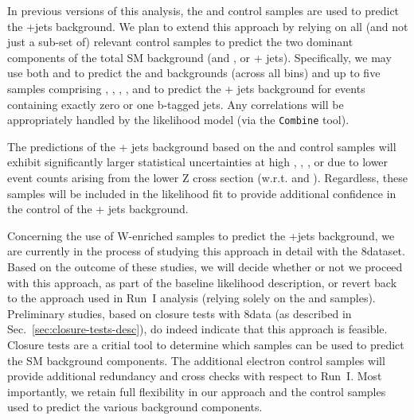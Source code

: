 {\bf

In previous versions of this analysis, the \mmj and \gj control
samples are used to predict the \znunu +jets background. We plan to
extend this approach by relying on all (and not just a sub-set of)
relevant control samples to predict the two dominant components of the
total SM background (\wj and \ttbar, or \znunu + jets). Specifically,
we may use both \mj and \ej to predict the \wj and \ttbar backgrounds
(across all \nb bins) and up to five samples comprising \zmmj, \zeej,
\gj, \wmj, and \wej to predict the \znunu + jets background for events
containing exactly zero or one b-tagged jets. Any correlations will be
appropriately handled by the likelihood model (via the
\texttt{Combine} tool).

The predictions of the \znunu + jets background based on the \zmmj and
\zeej control samples will exhibit significantly larger statistical
uncertainties at high \njet, \nb, \scalht, or \mht due to lower event
counts arising from the lower Z cross section (w.r.t. \gj and
\wj). Regardless, these samples will be included in the likelihood fit
to provide additional confidence in the control of the \znunu + jets
background.

Concerning the use of W-enriched samples to predict the \znunu +jets
background, we are currently in the process of studying this approach
in detail with the 8\TeV dataset. Based on the outcome of these studies,
we will decide whether or not we proceed with this approach, as part
of the baseline likelihood description, or revert back to the approach
used in Run~I analysis (\ie relying solely on the \zll and \gj
samples). Preliminary studies, based on closure tests with 8\TeV data
(as described in Sec.~\ref{sec:closure-tests-desc}), do indeed
indicate that this approach is feasible. Closure tests are a critial
tool to determine which samples can be used to predict the SM
background components. The additional electron control samples will
provide additional redundancy and cross checks with respect to Run~I. 
Most importantly, we retain full flexibility in our approach and the
control samples used to predict the various background components.

}
